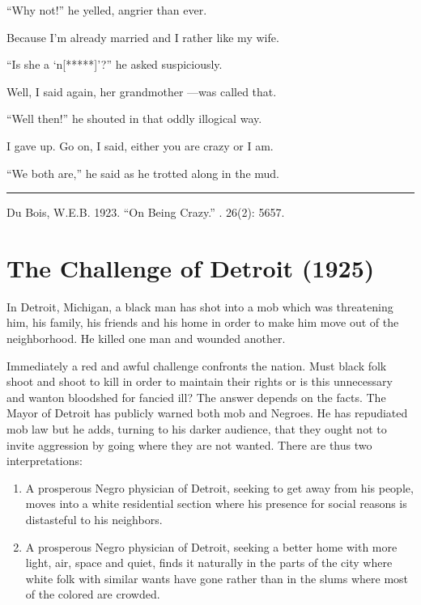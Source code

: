 \documentclass[letterpaper,10pt,english]{jupyterBook}
\begin{document}
\sphinxAtStartPar
“Why not!” he yelled, angrier than ever.

\sphinxAtStartPar
Because I’m already married and I rather like my wife.

\sphinxAtStartPar
“Is she a ‘n{[}*****{]}’?” he asked suspiciously.

\sphinxAtStartPar
Well, I said again, her grandmother —was called that.

\sphinxAtStartPar
“Well then!” he shouted in that oddly illogical way.

\sphinxAtStartPar
I gave up. Go on, I said, either you are crazy or I am.

\sphinxAtStartPar
“We both are,” he said as he trotted along in the mud.


\bigskip\hrule\bigskip


\sphinxAtStartPar
{} Du Bois, W.E.B. 1923. “On Being Crazy.” . 26(2): 56\sphinxhyphen{}57.


\section{The Challenge of Detroit (1925)}
\label{\detokenize{Volumes/31/01/challenge_of_detroit:the-challenge-of-detroit-1925}}\label{\detokenize{Volumes/31/01/challenge_of_detroit::doc}}
\sphinxAtStartPar
In Detroit, Michigan, a black man has shot into a mob which was threatening him, his family, his friends and his home in order to make him move out of the neighborhood. He killed one man and wounded another.



\sphinxAtStartPar
Immediately a red and awful challenge confronts the nation. Must black folk shoot and shoot to kill in order to maintain their rights or is this unnecessary and wanton bloodshed for fancied ill? The answer depends on the facts. The Mayor of Detroit has publicly warned both mob and Negroes. He has repudiated mob law but he adds, turning to his darker audience, that they ought not to invite aggression by going where they are not wanted. There are thus two interpretations:
\begin{enumerate}
%
\item {} 
\sphinxAtStartPar
A prosperous Negro physician of Detroit, seeking to get away from his people, moves into a white residential section where his presence for social reasons is distasteful to his neighbors.

\item {} 
\sphinxAtStartPar
A prosperous Negro physician of Detroit, seeking a better home with more light, air, space and quiet, finds it naturally in the parts of the city where white folk with similar wants have gone rather than in the slums where most of the colored are crowded.

\end{enumerate}
\end{document}
